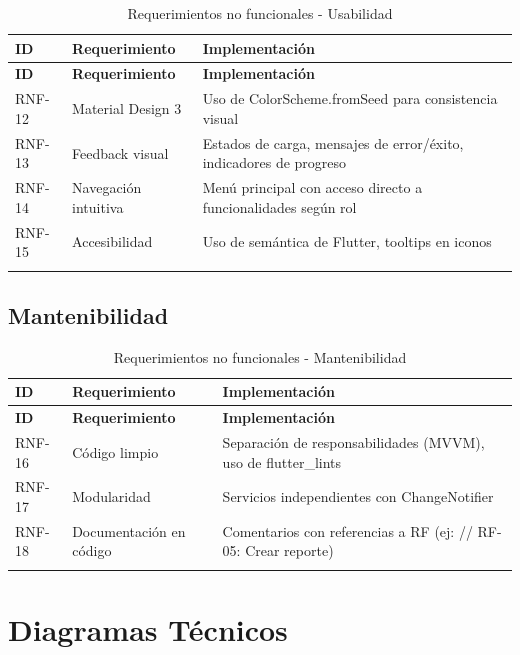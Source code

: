 \documentclass[12pt,a4paper]{article}
\begin{document}
\begin{longtable}{|p{1.5cm}|p{4cm}|p{8cm}|}
\hline
\textbf{ID} & \textbf{Requerimiento} & \textbf{Implementación} \\
\hline
\endfirsthead
\hline
\textbf{ID} & \textbf{Requerimiento} & \textbf{Implementación} \\
\hline
\endhead
RNF-12 & Material Design 3 & Uso de ColorScheme.fromSeed para consistencia visual \\
\hline
RNF-13 & Feedback visual & Estados de carga, mensajes de error/éxito, indicadores de progreso \\
\hline
RNF-14 & Navegación intuitiva & Menú principal con acceso directo a funcionalidades según rol \\
\hline
RNF-15 & Accesibilidad & Uso de semántica de Flutter, tooltips en iconos \\
\hline
\caption{Requerimientos no funcionales - Usabilidad}
\end{longtable}

\subsection{Mantenibilidad}

\begin{longtable}{|p{1.5cm}|p{4cm}|p{8cm}|}
\hline
\textbf{ID} & \textbf{Requerimiento} & \textbf{Implementación} \\
\hline
\endfirsthead
\hline
\textbf{ID} & \textbf{Requerimiento} & \textbf{Implementación} \\
\hline
\endhead
RNF-16 & Código limpio & Separación de responsabilidades (MVVM), uso de flutter\_lints \\
\hline
RNF-17 & Modularidad & Servicios independientes con ChangeNotifier \\
\hline
RNF-18 & Documentación en código & Comentarios con referencias a RF (ej: // RF-05: Crear reporte) \\
\hline
\caption{Requerimientos no funcionales - Mantenibilidad}
\end{longtable}


\section{Diagramas Técnicos}
\end{document}
